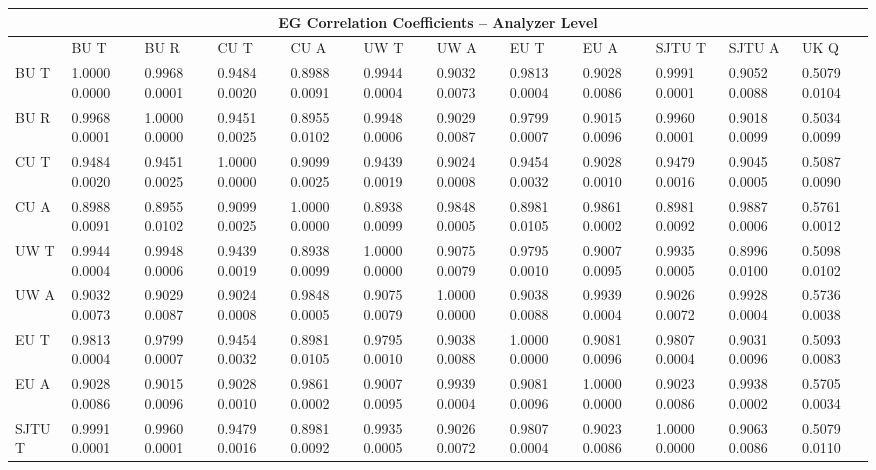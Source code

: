 

\begin{landscape}
\begin{table}
\small
\centering
\renewcommand{\arraystretch}{1.5}
\begin{tabularx}{1\linewidth}{@{\extracolsep{\fill}}lXXXXXXXXXXX}
  \toprule
  	\multicolumn{12}{c}{{\normalsize EG Correlation Coefficients -- Analyzer Level}} \\
  \midrule
  	       & BU T & BU R & CU T & CU A & UW T & UW A & EU T & EU A & SJTU T & SJTU A & UK Q \\
  \midrule
	BU T   & 1.0000 0.0000 & 0.9968 0.0001 & 0.9484 0.0020 & 0.8988 0.0091 & 0.9944 0.0004 & 0.9032 0.0073 & 0.9813 0.0004 & 0.9028 0.0086 & 0.9991 0.0001 & 0.9052 0.0088 & 0.5079 0.0104  \\
	BU R   & 0.9968 0.0001 & 1.0000 0.0000 & 0.9451 0.0025 & 0.8955 0.0102 & 0.9948 0.0006 & 0.9029 0.0087 & 0.9799 0.0007 & 0.9015 0.0096 & 0.9960 0.0001 & 0.9018 0.0099 & 0.5034 0.0099  \\
	CU T   & 0.9484 0.0020 & 0.9451 0.0025 & 1.0000 0.0000 & 0.9099 0.0025 & 0.9439 0.0019 & 0.9024 0.0008 & 0.9454 0.0032 & 0.9028 0.0010 & 0.9479 0.0016 & 0.9045 0.0005 & 0.5087 0.0090  \\
	CU A   & 0.8988 0.0091 & 0.8955 0.0102 & 0.9099 0.0025 & 1.0000 0.0000 & 0.8938 0.0099 & 0.9848 0.0005 & 0.8981 0.0105 & 0.9861 0.0002 & 0.8981 0.0092 & 0.9887 0.0006 & 0.5761 0.0012  \\
	UW T   & 0.9944 0.0004 & 0.9948 0.0006 & 0.9439 0.0019 & 0.8938 0.0099 & 1.0000 0.0000 & 0.9075 0.0079 & 0.9795 0.0010 & 0.9007 0.0095 & 0.9935 0.0005 & 0.8996 0.0100 & 0.5098 0.0102  \\
	UW A   & 0.9032 0.0073 & 0.9029 0.0087 & 0.9024 0.0008 & 0.9848 0.0005 & 0.9075 0.0079 & 1.0000 0.0000 & 0.9038 0.0088 & 0.9939 0.0004 & 0.9026 0.0072 & 0.9928 0.0004 & 0.5736 0.0038  \\
	EU T   & 0.9813 0.0004 & 0.9799 0.0007 & 0.9454 0.0032 & 0.8981 0.0105 & 0.9795 0.0010 & 0.9038 0.0088 & 1.0000 0.0000 & 0.9081 0.0096 & 0.9807 0.0004 & 0.9031 0.0096 & 0.5093 0.0083  \\
	EU A   & 0.9028 0.0086 & 0.9015 0.0096 & 0.9028 0.0010 & 0.9861 0.0002 & 0.9007 0.0095 & 0.9939 0.0004 & 0.9081 0.0096 & 1.0000 0.0000 & 0.9023 0.0086 & 0.9938 0.0002 & 0.5705 0.0034  \\
	SJTU T & 0.9991 0.0001 & 0.9960 0.0001 & 0.9479 0.0016 & 0.8981 0.0092 & 0.9935 0.0005 & 0.9026 0.0072 & 0.9807 0.0004 & 0.9023 0.0086 & 1.0000 0.0000 & 0.9063 0.0086 & 0.5079 0.0110  \\

\end{tabularx}
\end{table}
\end{landscape}
